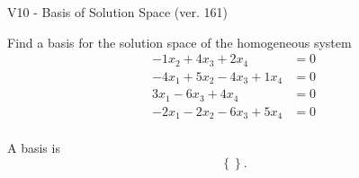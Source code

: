 \begin{exercise}
  \begin{exerciseTitle}V10 - Basis of Solution Space (ver. 161)\end{exerciseTitle}
  \begin{exerciseStatement}
    Find a basis for the solution space of the homogeneous system 
\begin{align*}
 -1 x_ 2 + 4 x_ 3 + 2 x_ 4 &= 0  \\ 
  -4 x_ 1 + 5 x_ 2 -4 x_ 3 + 1 x_ 4 &= 0  \\ 
  3 x_ 1 -6 x_ 3 + 4 x_ 4 &= 0  \\ 
  -2 x_ 1 -2 x_ 2 -6 x_ 3 + 5 x_ 4 &= 0  \\ 
 \end{align*}


 
  \end{exerciseStatement}

  \begin{exerciseAnswer}
   A basis is   
\[\left\{\right\}.\]

  


  \end{exerciseAnswer}
\end{exercise}